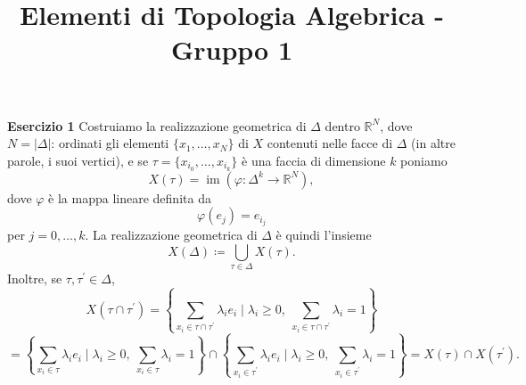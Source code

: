 \documentclass[a4paper]{article}
\title{Elementi di Topologia Algebrica - Gruppo 1}
\newcommand{\R}{\mathbb{R}}
\newcommand{\im}{\operatorname{im}}
\theoremstyle{definition}
\theoremstyle{definition}
\theoremstyle{remark}
\theoremstyle{definition}
\begin{document}
\maketitle

\textbf{Esercizio 1}
Costruiamo la realizzazione geometrica di $\Delta$ dentro $\R^N$, dove $N=|\Delta|$: ordinati gli elementi $\{x_1,\ldots,x_N\}$ di $X$ contenuti
nelle facce di $\Delta$ (in altre parole, i suoi vertici), e se $\tau=\{x_{i_0},\ldots,x_{i_k}\}$ è una faccia di dimensione $k$ poniamo
\[
    X(\tau) = \im(\varphi: \Delta^{k} \to \R^N),
\]
dove $\varphi$ è la mappa lineare definita da
\[
    \varphi(e_j) = e_{i_j}
\]
per $j=0,\ldots,k$. La realizzazione geometrica di $\Delta$ è quindi l'insieme
\[
    X(\Delta) \coloneqq \bigcup_{\tau \in \Delta} X(\tau).
\]
Inoltre, se $\tau,\tau^\prime \in \Delta$,
\[
    X(\tau \cap \tau^\prime) = \left\{ \sum_{x_i \in \tau \cap \tau^\prime} \lambda_i e_i \mid \lambda_i\geq 0,~ \sum_{x_i \in \tau \cap \tau^\prime} \lambda_i = 1 \right\}
\]
    \[= \left\{ \sum_{x_i \in \tau } \lambda_i e_i \mid  \lambda_i\geq 0,~\sum_{x_i \in \tau } \lambda_i = 1 \right\} \cap \left\{ \sum_{x_i \in \tau^\prime } \lambda_i e_i \mid \lambda_i\geq 0,~\sum_{x_i \in \tau^\prime} \lambda_i = 1
    \right\} = X(\tau) \cap X(\tau^\prime).
\]
\end{document}
